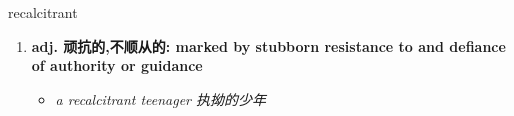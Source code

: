 
\begin{frame}
{\huge recalcitrant}
\begin{center}
\begin{enumerate}\Large
  \item \textbf{adj. 顽抗的,不顺从的: marked by stubborn resistance to and defiance of authority or guidance}
  \begin{itemize}
    \item \em{\Large{a recalcitrant teenager 执拗的少年}}
  \end{itemize}
\end{enumerate}
\end{center}
\end{frame}
